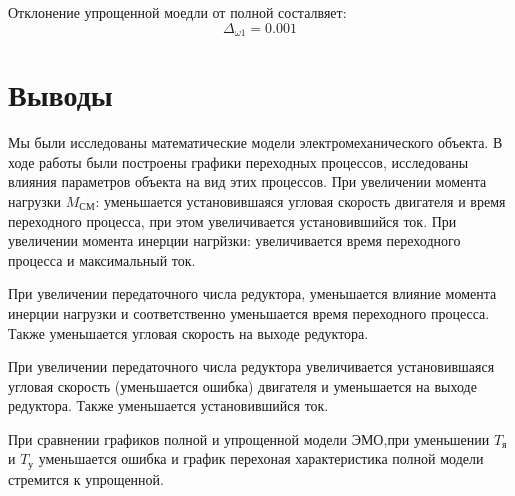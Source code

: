 \documentclass[a4paper, 12pt]{article}
\begin{document}
Отклонение упрощенной моедли от полной состалвяет:
\begin{equation}
    \Delta_{\omega1} = 0.001
\end{equation}

\newpage
\section*{\centering Выводы}
Мы были исследованы математические модели электромеханического объекта. В ходе работы были построены графики переходных процессов, исследованы влияния параметров объекта на вид этих процессов. При увеличении момента нагрузки $M_\text{СМ}$: уменьшается установившаяся угловая скорость двигателя и время переходного процесса, при этом увеличивается установившийся ток. При увеличении момента инерции нагрйзки: увеличивается время переходного процесса и максимальный ток. \par
При увеличении передаточного числа редуктора, уменьшается влияние момента инерции нагрузки и соответственно уменьшается время переходного процесса. Также уменьшается угловая скорость на выходе редуктора. \par
При увеличении передаточного числа редуктора увеличивается установившаяся угловая скорость (уменьшается ошибка) двигателя и уменьшается на выходе редуктора. Также уменьшается установившийся ток. \par
При сравнении графиков полной и упрощенной модели ЭМО,при уменьшении $T_\text{я}$ и $T_\text{у}$ уменьшается ошибка и график перехоная характеристика полной модели стремится к упрощенной. \par
\end{document}
